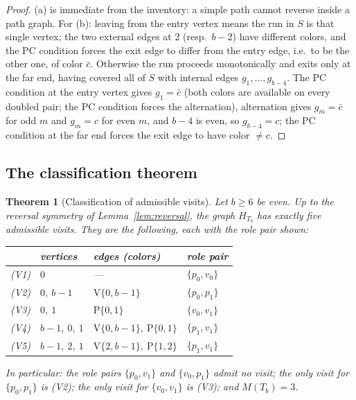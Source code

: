 \documentclass[11pt]{article}
\newtheorem{theorem}{Theorem}[section]
\theoremstyle{definition}
\begin{document}
\begin{proof}
(a) is immediate from the inventory: a simple path cannot reverse inside a path graph.
For (b): leaving from the entry vertex means the run in $S$ is that single vertex; the
two external edges at $2$ (resp.\ $b-2$) have different colors, and the PC condition
forces the exit edge to differ from the entry edge, i.e.\ to be the other one, of color
$\bar c$. Otherwise the run proceeds monotonically and exits only at the far end,
having covered all of $S$ with internal edges $g_1,\dots,g_{b-4}$. The PC condition at
the entry vertex gives $g_1 = \bar c$ (both colors are available on every doubled pair;
the PC condition forces the alternation), alternation gives $g_m=\bar c$ for odd $m$
and $g_m=c$ for even $m$, and $b-4$ is even, so $g_{b-4}=c$; the PC condition at the far
end forces the exit edge to have color $\ne c$.
\end{proof}

\subsection{The classification theorem}

\begin{theorem}[Classification of admissible visits]\label{thm:classification}
Let $b \ge 6$ be even. Up to the reversal symmetry of Lemma~\ref{lem:reversal},
the graph $H_{T_b}$ has exactly five admissible visits. They are the following, each with the role pair shown:
\begin{center}
\begin{tabular}{clll}
\toprule
 & vertices & edges (colors) & role pair \\
\midrule
(V1) & $0$ & --- & $\{p_0, v_0\}$ \\
(V2) & $0,\ b-1$ & $\mathrm V\{0,b{-}1\}$ & $\{p_0, p_1\}$ \\
(V3) & $0,\ 1$ & $\mathrm P\{0,1\}$ & $\{v_0, v_1\}$ \\
(V4) & $b-1,\ 0,\ 1$ & $\mathrm V\{0,b{-}1\},\ \mathrm P\{0,1\}$ & $\{p_1, v_1\}$ \\
(V5) & $b-1,\ 2,\ 1$ & $\mathrm V\{2,b{-}1\},\ \mathrm P\{1,2\}$ & $\{p_1, v_1\}$ \\
\bottomrule
\end{tabular}
\end{center}
In particular: the role pairs $\{p_0, v_1\}$ and $\{v_0, p_1\}$ admit no visit; the
only visit for $\{p_0, p_1\}$ is (V2); the only visit for $\{v_0, v_1\}$ is (V3); and
$M(T_b) = 3$.
\end{theorem}
\end{document}
